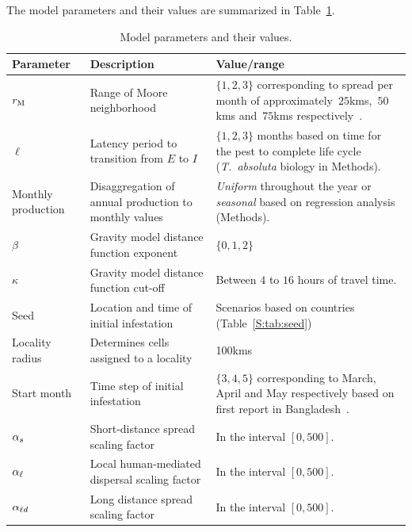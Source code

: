 \documentclass[11pt]{article}
\newcommand{\tuta}{\emph{T.~absoluta}}
\newcommand{\infest}{\rho}
\newcommand{\suitable}{\epsilon}
\theoremstyle{definition}
\begin{document}
The model parameters and their values are summarized in
Table~\ref{tab:param}. 
\begin{table}[ht]
\caption{Model parameters and their values.\label{tab:param}}
    \centering
	\small
{} %
    \begin{tabular}{p{}p{}p{}}
		\hline		
		Parameter & Description & Value/range \\
\hline		
\hline
$r_\mathrm{M}$ & Range of Moore neighborhood & $\{1,2,3\}$ corresponding to
spread per month of 
approximately~$25$kms,~$50$kms and~$75$kms
respectively~\cite{guimapi2016modeling,martins2018assessing}. \\
$\ell$ & Latency period to transition from $E$ to $I$ & $\{1,2,3\}$ months
based on time for the pest to complete life cycle (\tuta{} biology in
Methods). \\
Monthly production & Disaggregation of annual production to monthly values
& \emph{Uniform} throughout the year or \emph{seasonal} based on regression
analysis (Methods). \\
$\beta$ & Gravity model distance function exponent & $\{0,1,2\}$ \\
$\kappa$ & Gravity model distance function cut-off & Between $4$ to $16$ hours
of travel time. \\
Seed & Location and time of initial infestation & Scenarios based on
countries (Table~\ref{S:tab:seed})\\
Locality radius & Determines cells assigned to a locality & 100kms \\\hline
Start month & Time step of initial infestation & $\{3,4,5\}$ corresponding
to March, April and May respectively based on first report in
Bangladesh~\cite{hossain2016first}. \\
$\alpha_s$ & Short-distance spread scaling factor & In the interval $[0,500]$.\\
$\alpha_{\ell}$ & Local human-mediated dispersal scaling factor & In the interval $[0,500]$.\\
$\alpha_{\ell d}$ & Long distance spread scaling factor & In the interval $[0,500]$.\\
\hline
\end{tabular}
\end{table}
\end{document}
